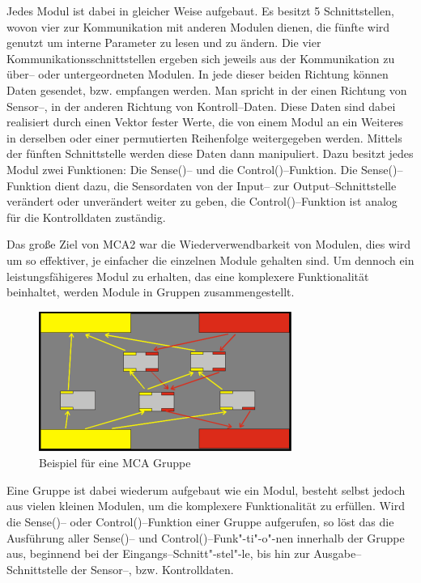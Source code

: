 Jedes Modul ist dabei in gleicher Weise aufgebaut. Es besitzt 5 Schnittstellen, wovon vier zur Kommunikation mit anderen Modulen dienen,
 die fünfte wird genutzt um interne Parameter zu lesen und zu ändern. Die vier Kommunikationsschnittstellen ergeben sich jeweils aus der
 Kommunikation zu über-- oder untergeordneten Modulen. In jede dieser beiden Richtung können Daten gesendet, bzw. empfangen werden.
 Man spricht in der einen Richtung von Sensor--, in der anderen Richtung von Kontroll--Daten. Diese Daten sind dabei realisiert durch einen Vektor fester Werte,
 die von einem Modul an ein Weiteres in derselben oder einer permutierten Reihenfolge weitergegeben werden.
 Mittels der fünften Schnittstelle werden diese Daten dann manipuliert. Dazu besitzt jedes Modul zwei Funktionen: Die Sense()-- und die Control()--Funktion.
 Die Sense()--Funktion dient dazu, die Sensordaten von der Input-- zur Output--Schnittstelle verändert oder unverändert weiter zu geben, die Control()--Funktion ist
 analog für die Kontrolldaten zuständig.

Das große Ziel von MCA2 war die Wiederverwendbarkeit von Modulen, dies wird um so effektiver, je einfacher die einzelnen Module gehalten sind.
 Um dennoch ein leistungsfähigeres Modul zu erhalten, das eine komplexere Funktionalität beinhaltet, werden Module in Gruppen zusammengestellt. 

\begin{figure}[h]
	\center
	\includegraphics[scale=2.0]{graphics/mcagroup.png}
	\caption{\label{fig:MCA-Gruppe} Beispiel für eine MCA Gruppe}
\end{figure}

Eine Gruppe ist dabei wiederum aufgebaut wie ein Modul, besteht selbst jedoch aus vielen kleinen Modulen,
 um die komplexere Funktionalität zu erfüllen. Wird die Sense()-- oder Control()--Funktion einer Gruppe aufgerufen,
 so löst das die Ausführung aller Sense()-- und Control()--Funk"-ti"-o"-nen
 innerhalb der Gruppe aus, beginnend bei der Eingangs--Schnitt"-stel"-le, bis hin
 zur Ausgabe--Schnittstelle der Sensor--, bzw. Kontrolldaten.

